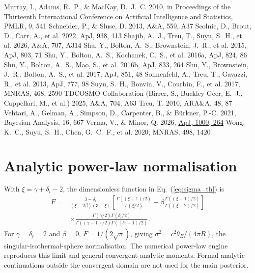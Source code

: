 \documentclass{aa}
\providecommand{\aap}{A\&A}
\providecommand{\apj}{ApJ}
\providecommand{\mnras}{MNRAS}
\providecommand{\araa}{ARA\&A}
\begin{document}
\begin{thebibliography}{}
 Murray, I., Adams, R.~P., \& MacKay, D.~J.~C. 2010, in Proceedings of the Thirteenth International Conference on Artificial Intelligence and Statistics, PMLR, 9, 541
 Schneider, P., \& Sluse, D. 2013, \aap, 559, A37
 Scolnic, D., Brout, D., Carr, A., et al. 2022, \apj, 938, 113
 Shajib, A.~J., Treu, T., Suyu, S.~H., et al. 2026, \aap, 707, A314
 Shu, Y., Bolton, A.~S., Brownstein, J.~R., et al. 2015, \apj, 803, 71
 Shu, Y., Bolton, A.~S., Kochanek, C.~S., et al. 2016a, \apj, 824, 86
 Shu, Y., Bolton, A.~S., Mao, S., et al. 2016b, \apj, 833, 264
 Shu, Y., Brownstein, J.~R., Bolton, A.~S., et al. 2017, \apj, 851, 48
 Sonnenfeld, A., Treu, T., Gavazzi, R., et al. 2013, \apj, 777, 98
 Suyu, S.~H., Bonvin, V., Courbin, F., et al. 2017, \mnras, 468, 2590
 TDCOSMO Collaboration (Birrer, S., Buckley-Geer, E.~J., Cappellari, M., et al.) 2025, \aap, 704, A63
 Treu, T. 2010, \araa, 48, 87
 Vehtari, A., Gelman, A., Simpson, D., Carpenter, B., \& B\"urkner, P.-C. 2021, Bayesian Analysis, 16, 667
 Verma, V., \& Minor, Q. 2026, \href{https://doi.org/10.3847/1538-4357/ae4722}{\apj, 1000, 264}
 Wong, K.~C., Suyu, S.~H., Chen, G.~C.~F., et al. 2020, \mnras, 498, 1420

\end{thebibliography}
\appendix
\section{Analytic power-law normalisation}\label{sec:analytic}
With $\xi=\gamma+\delta_i-2$, the dimensionless function in Eq.~(\ref{eq:sigma_th}) is
\begin{equation}
\begin{split}
F={}&\frac{3-\delta_i}{(\xi-2\beta)(3-\xi)}
\left[\frac{\Gamma((\xi-1)/2)}{\Gamma(\xi/2)}-
\beta\frac{\Gamma((\xi+1)/2)}{\Gamma((\xi+2)/2)}\right]\\
&\times\frac{\Gamma(\gamma/2)\Gamma(\delta_i/2)}{\Gamma((\gamma-1)/2)\Gamma((\delta_i-1)/2)}.
\end{split}
\end{equation}
For $\gamma=\delta_i=2$ and $\beta=0$, $F=1/(2\sqrt\pi)$, giving $\sigma^2=c^2\theta_E/(4\pi R)$, the singular-isothermal-sphere normalisation. The numerical power-law engine reproduces this limit and general convergent analytic moments. Formal analytic continuations outside the convergent domain are not used for the main posterior.
\end{document}
